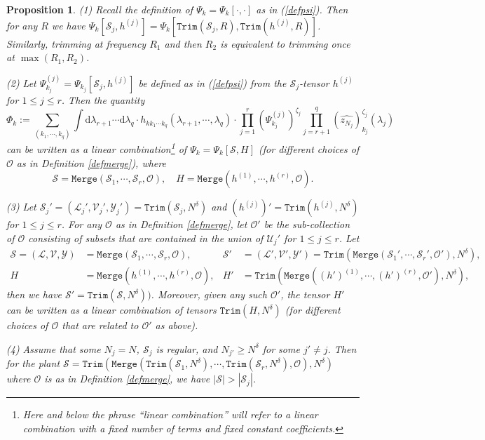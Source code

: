 \documentclass[11 pt,reqno]{amsart}
\newtheorem{prop}[thm]{Proposition}
\theoremstyle{definition}
\theoremstyle{remark}
\numberwithin{equation}{section}
\newcommand{\Sc}{\mathcal{S}}
\newcommand{\Lc}{\mathcal{L}}
\newcommand{\Uc}{\mathcal{U}}
\newcommand{\Vc}{\mathcal{V}}
\newcommand{\Yc}{\mathcal{Y}}
\newcommand{\Os}{\mathscr{O}}
\begin{document}
{\begin{prop}
 (1) Recall the definition of $\Psi_k=\Psi_k[\cdot,\cdot]$ as in (\ref{defpsi}). Then for any $R$ we have $\Psi_k[\Sc_j,h^{(j)}]=\Psi_k[\mathtt{Trim}(\Sc_j,R),\mathtt{Trim}(h^{(j)},R)]$. Similarly, trimming at frequency $R_1$ and then $R_2$ is equivalent to trimming once at $\max(R_1,R_2)$.
 
 (2) Let $\Psi_{k_j}^{(j)}=\Psi_{k_j}[\Sc_j,h^{(j)}]$ be defined as in (\ref{defpsi}) from the $\Sc_j$-tensor $h^{(j)}$ for $1\leq j\leq r$. Then the quantity
 \begin{equation}\label{defphi}\Phi_k:=\sum_{(k_1,\cdots,k_q)}\int\mathrm{d}\lambda_{r+1}\cdots\mathrm{d}\lambda_q\cdot h_{kk_1\cdots k_q}(\lambda_{r+1},\cdots,\lambda_{q})\cdot\prod_{j=1}^r(\Psi_{k_j}^{(j)})^{\zeta_j}\prod_{j=r+1}^q(\widehat{z_{N_j}})_{k_j}^{\zeta_j}(\lambda_j)
 \end{equation} can be written as a linear combination\footnote{Here and below the phrase ``linear combination'' will refer to a linear combination with a fixed number of terms and fixed constant coefficients.} of $\Psi_k=\Psi_k[\Sc,H]$ (for different choices of $\Os$ as in Definition \ref{defmerge}), where
 \[\Sc=\mathtt{Merge}(\Sc_1,\cdots,\Sc_r,\Os),\quad H=\mathtt{Merge}(h^{(1)},\cdots,h^{(r)},\Os).\]
 
 (3) Let $\Sc_j'=(\Lc_j',\Vc_j',\Yc_j')=\mathtt{Trim}(\Sc_j,N^\delta)$ and $(h^{(j)})'=\mathtt{Trim}(h^{(j)},N^\delta)$ for $1\leq j\leq r$. For any $\Os$ as in Definition \ref{defmerge}, let $\Os'$ be the sub-collection of $\Os$ consisting of subsets that are contained in the union of $\Uc_j'$ for $1\leq j\leq r$. Let \begin{equation*}\begin{aligned}\Sc=(\Lc,\Vc,\Yc)&=\mathtt{Merge}(\Sc_1,\cdots,\Sc_r,\Os),&\Sc'&=(\Lc',\Vc',\Yc')=\mathtt{Trim}(\mathtt{Merge}(\Sc_1',\cdots,\Sc_r',\Os'),N^\delta),\\H&=\mathtt{Merge}(h^{(1)},\cdots,h^{(r)},\Os),&H'&= \mathtt{Trim}(\mathtt{Merge}((h')^{(1)},\cdots,(h')^{(r)},\Os'),N^\delta),\end{aligned}\end{equation*}then we have $\Sc'=\mathtt{Trim}(\Sc,N^\delta))$.
 Moreover, given any such $\Os'$, the tensor $H'$ can be written as a linear combination of tensors $\mathtt{Trim}(H,N^\delta)$ (for different choices of $\Os$ that are related to $\Os'$ as above).
 
 (4) Assume that some $N_j=N$, $\Sc_j$ is regular, and $N_{j'}\geq N^\delta$ for some $j'\neq j$. Then for the plant $\Sc=\mathtt{Trim}(\mathtt{Merge}(\mathtt{Trim}(\Sc_1,N^\delta),\cdots,\mathtt{Trim}(\Sc_r,N^\delta),\Os),N^\delta)$ where $\Os$ is as in Definition \ref{defmerge}, we have $|\Sc|>|\Sc_j|$.
 

\end{prop}}
\end{document}
